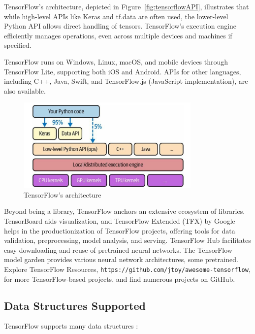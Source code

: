 TensorFlow's architecture, depicted in Figure~\ref{fig:tensorflowAPI}, illustrates that while high-level APIs like Keras and tf.data are often used, the lower-level Python API allows direct handling of tensors. TensorFlow's execution engine efficiently manages operations, even across multiple devices and machines if specified.

TensorFlow runs on Windows, Linux, macOS, and mobile devices through TensorFlow Lite, supporting both iOS and Android. APIs for other languages, including C++, Java, Swift, and TensorFlow.js (JavaScript implementation), are also available.

\begin{figure}[h!]
	\centering
	\includegraphics[width=0.8\textwidth]{Images/TensorFlow/tensorflowArchitecture}
	\caption{TensorFlow’s architecture \cite{Geron:2022}}
	\label{fig:tensorflowArchitecture}
\end{figure}


Beyond being a library, TensorFlow anchors an extensive ecosystem of libraries. TensorBoard aids visualization, and TensorFlow Extended (TFX) by Google helps in the productionization of TensorFlow projects, offering tools for data validation, preprocessing, model analysis, and serving. TensorFlow Hub facilitates easy downloading and reuse of pretrained neural networks. The TensorFlow model garden provides various neural network architectures, some pretrained. Explore TensorFlow Resources, \texttt{https://github.com/jtoy/awesome-tensorflow}, for more TensorFlow-based projects, and find numerous projects on GitHub.

\subsection{Data Structures Supported}

TensorFlow supports many data structures \cite{Geron:2022}:

